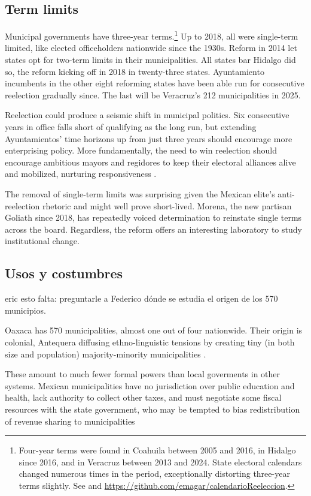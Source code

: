 \documentclass[letter,12pt]{article}
\begin{document}
\subsection{Term limits}
Municipal governments have three-year terms.\footnote{Four-year terms were found in Coahuila between 2005 and 2016, in Hidalgo since 2016, and in Veracruz between 2013 and 2024. State electoral calendars changed numerous times in the period, exceptionally distorting three-year terms slightly. See \citet{magarInstReel.2017} and \url{https://github.com/emagar/calendarioReeleccion}.} Up to 2018, all were single-term limited, like elected officeholders nationwide since the 1930s. Reform in 2014 let states opt for two-term limits in their municipalities. All states bar Hidalgo did so, the reform kicking off in 2018 in twenty-three states. Ayuntamiento incumbents in the other eight reforming states have been able run for consecutive reelection gradually since. The last will be Veracruz's 212 municipalities in 2025.

Reelection could produce a seismic shift in municipal politics. Six consecutive years in office falls short of qualifying as the long run, but extending Ayuntamientos' time horizons up from just three years should encourage more enterprising policy. More fundamentally, the need to win reelection should encourage ambitious mayors and regidores to keep their electoral alliances alive and mobilized, nurturing responsiveness \citep{cain.etal.1987, jacobson.kernell.1983, cox.mccubbins.1986}.

The removal of single-term limits was surprising given the Mexican elite's anti-reelection rhetoric and might well prove short-lived. Morena, the new partisan Goliath since 2018, has repeatedly voiced determination to reinstate single terms across the board. Regardless, the reform offers an interesting laboratory to study institutional change.   

\subsection{Usos y costumbres}
eric esto falta: preguntarle a Federico dónde se estudia el origen de los 570 municipios.

Oaxaca has 570 municipalities, almost one out of four nationwide. Their origin is colonial, Antequera diffusing ethno-linguistic tensions by creating tiny (in both size and population) majority-minority municipalities \citep{elizarraras.2002}. 

These amount to much fewer formal powers than local goverments in other systems. Mexican municipalities have no jurisdiction over public education and health, lack authority to collect other taxes, and must negotiate some fiscal resources with the state government, who may be tempted to bias redistribution of revenue sharing to municipalities \citep{timmons.broid.2013} 
\end{document}
